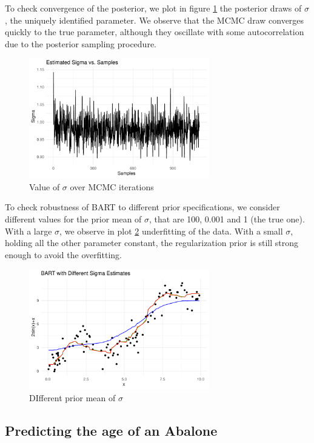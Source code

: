 \documentclass[a4paper,11pt]{article}
\begin{document}
To check convergence of the posterior, we plot in figure \ref{plot_sin2} the posterior draws of $\sigma$, the uniquely identified parameter. We observe that the MCMC draw converges quickly to the true parameter, although they oscillate with some autocorrelation due to the posterior sampling procedure.

\begin{figure}
  \centering
  \includegraphics[width=0.7\textwidth]{outputs/sigma_plot.pdf}
  \caption{Value of $\sigma$ over MCMC iterations}
  \label{plot_sin2}
\end{figure}


To check robustness of BART to different prior specifications, we consider different values for the prior mean of $\sigma$,  that are 100, 0.001 and 1 (the true one). With a large $\sigma$, we observe in plot \ref{plot_sin3} underfitting of the data. With a small $\sigma$, holding all the other parameter constant, the regularization prior is still strong enough to avoid the overfitting.

\begin{figure}
  \centering
  \includegraphics[width=0.7\textwidth]{outputs/sin_plot_diff_sigma.pdf}
  \caption{DIfferent prior mean of $\sigma$}
  \label{plot_sin3}
\end{figure}


\subsection{Predicting the age of an Abalone}
\end{document}
